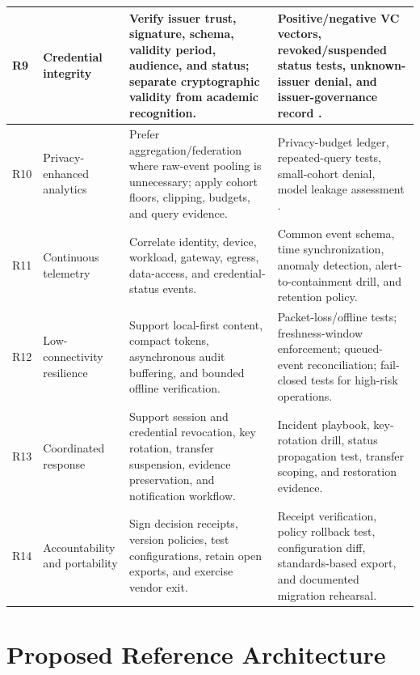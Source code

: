 \documentclass[journal]{IEEEtran}
\begin{document}
\begin{table}[t]
\begin{tabularx}{\textwidth}{|p{}|p{}|p{}|Y|}
\hline
R9 & Credential integrity & Verify issuer trust, signature, schema, validity period, audience, and status; separate cryptographic validity from academic recognition. & Positive/negative VC vectors, revoked/suspended status tests, unknown-issuer denial, and issuer-governance record \cite{w3cvc20,w3cstatus}. \\
\hline
R10 & Privacy-enhanced analytics & Prefer aggregation/federation where raw-event pooling is unnecessary; apply cohort floors, clipping, budgets, and query evidence. & Privacy-budget ledger, repeated-query tests, small-cohort denial, model leakage assessment \cite{Dwork2006DP,McMahan2017FL,Bonawitz2017SecureAgg}. \\
\hline
R11 & Continuous telemetry & Correlate identity, device, workload, gateway, egress, data-access, and credential-status events. & Common event schema, time synchronization, anomaly detection, alert-to-containment drill, and retention policy. \\
\hline
R12 & Low-connectivity resilience & Support local-first content, compact tokens, asynchronous audit buffering, and bounded offline verification. & Packet-loss/offline tests; freshness-window enforcement; queued-event reconciliation; fail-closed tests for high-risk operations. \\
\hline
R13 & Coordinated response & Support session and credential revocation, key rotation, transfer suspension, evidence preservation, and notification workflow. & Incident playbook, key-rotation drill, status propagation test, transfer scoping, and restoration evidence. \\
\hline
R14 & Accountability and portability & Sign decision receipts, version policies, test configurations, retain open exports, and exercise vendor exit. & Receipt verification, policy rollback test, configuration diff, standards-based export, and documented migration rehearsal. \\
\hline
\end{tabularx}
\end{table}

\section{Proposed Reference Architecture}
\end{document}
